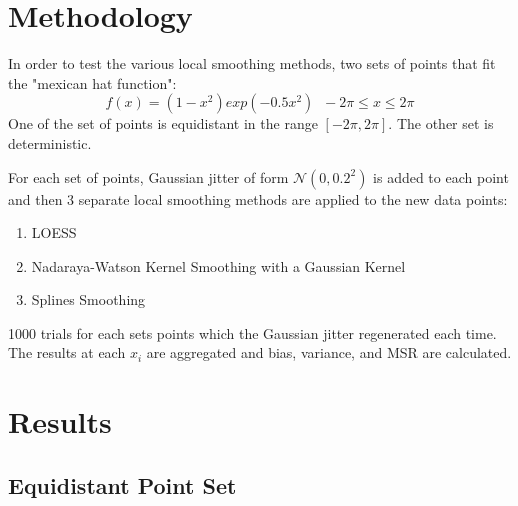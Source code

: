 \documentclass[12pt,letterpaper]{article}
\begin{document}
\section*{Methodology}

In order to test the various local smoothing methods, two sets of points that fit the "mexican hat function":
\begin{equation}
    f(x) = (1-x^2)exp(-0.5 x^2)\;\; -2\pi \le x \le 2\pi
\end{equation}
One of the set of points is equidistant in the range $[-2\pi, 2\pi]$. The other set is deterministic. 

For each set of points, Gaussian jitter of form $\mathcal{N}(0,0.2^2)$ is added to each point and then 3 separate local smoothing methods are applied to the new data points:
\begin{enumerate}
    \item LOESS
    \item Nadaraya-Watson Kernel Smoothing with a Gaussian Kernel
    \item Splines Smoothing
\end{enumerate}

1000 trials for each sets points which the Gaussian jitter regenerated each time. The results at each $x_i$ are aggregated and bias, variance, and MSR are calculated.

\section*{Results}

\subsection*{Equidistant Point Set}
\end{document}
